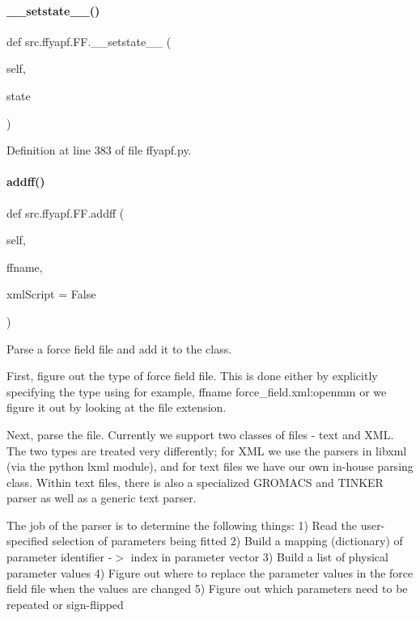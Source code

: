 \paragraph{\texorpdfstring{\+\_\+\+\_\+setstate\+\_\+\+\_\+()}{\_\_setstate\_\_()}}
{\footnotesize\ttfamily def src.\+ffyapf.\+F\+F.\+\_\+\+\_\+setstate\+\_\+\+\_\+ (\begin{DoxyParamCaption}\item[{}]{self,  }\item[{}]{state }\end{DoxyParamCaption})}



Definition at line 383 of file ffyapf.\+py.

\mbox{\label{classsrc_1_1ffyapf_1_1FF_afffd561460e3fbf6216709f63efa103f}} 
\paragraph{\texorpdfstring{addff()}{addff()}}
{\footnotesize\ttfamily def src.\+ffyapf.\+F\+F.\+addff (\begin{DoxyParamCaption}\item[{}]{self,  }\item[{}]{ffname,  }\item[{}]{xml\+Script = {\ttfamily False} }\end{DoxyParamCaption})}



Parse a force field file and add it to the class. 

First, figure out the type of force field file. This is done either by explicitly specifying the type using for example, {\ttfamily  ffname force\+\_\+field.\+xml\+:openmm } or we figure it out by looking at the file extension.

Next, parse the file. Currently we support two classes of files -\/ text and X\+ML. The two types are treated very differently; for X\+ML we use the parsers in libxml (via the python lxml module), and for text files we have our own in-\/house parsing class. Within text files, there is also a specialized G\+R\+O\+M\+A\+CS and T\+I\+N\+K\+ER parser as well as a generic text parser.

The job of the parser is to determine the following things\+: 1) Read the user-\/specified selection of parameters being fitted 2) Build a mapping (dictionary) of {\ttfamily  parameter identifier -\/$>$ index in parameter vector } 3) Build a list of physical parameter values 4) Figure out where to replace the parameter values in the force field file when the values are changed 5) Figure out which parameters need to be repeated or sign-\/flipped

